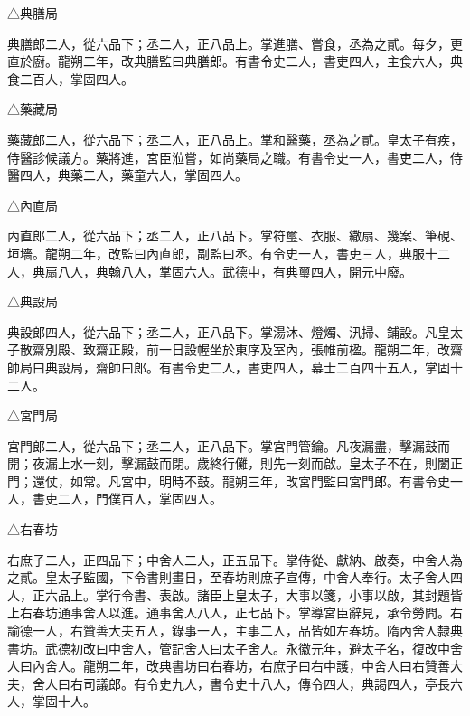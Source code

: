 \begin{pinyinscope}
 △典膳局



 典膳郎二人，從六品下；丞二人，正八品上。掌進膳、嘗食，丞為之貳。每夕，更直於廚。龍朔二年，改典膳監曰典膳郎。有書令史二人，書吏四人，主食六人，典食二百人，掌固四人。



 △藥藏局



 藥藏郎二人，從六品下；丞二人，正八品上。掌和醫藥，丞為之貳。皇太子有疾，侍醫診候議方。藥將進，宮臣涖嘗，如尚藥局之職。有書令史一人，書吏二人，侍醫四人，典藥二人，藥童六人，掌固四人。



 △內直局



 內直郎二人，從六品下；丞二人，正八品下。掌符璽、衣服、繖扇、幾案、筆硯、垣墻。龍朔二年，改監曰內直郎，副監曰丞。有令史一人，書吏三人，典服十二人，典扇八人，典翰八人，掌固六人。武德中，有典璽四人，開元中廢。



 △典設局



 典設郎四人，從六品下；丞二人，正八品下。掌湯沐、燈燭、汛掃、鋪設。凡皇太子散齋別殿、致齋正殿，前一日設幄坐於東序及室內，張帷前楹。龍朔二年，改齋帥局曰典設局，齋帥曰郎。有書令史二人，書吏四人，幕士二百四十五人，掌固十二人。



 △宮門局



 宮門郎二人，從六品下；丞二人，正八品下。掌宮門管鑰。凡夜漏盡，擊漏鼓而開；夜漏上水一刻，擊漏鼓而閉。歲終行儺，則先一刻而啟。皇太子不在，則闔正門；還仗，如常。凡宮中，明時不鼓。龍朔三年，改宮門監曰宮門郎。有書令史一人，書吏二人，門僕百人，掌固四人。



 △右春坊



 右庶子二人，正四品下；中舍人二人，正五品下。掌侍從、獻納、啟奏，中舍人為之貳。皇太子監國，下令書則畫日，至春坊則庶子宣傳，中舍人奉行。太子舍人四人，正六品上。掌行令書、表啟。諸臣上皇太子，大事以箋，小事以啟，其封題皆上右春坊通事舍人以進。通事舍人八人，正七品下。掌導宮臣辭見，承令勞問。右諭德一人，右贊善大夫五人，錄事一人，主事二人，品皆如左春坊。隋內舍人隸典書坊。武德初改曰中舍人，管記舍人曰太子舍人。永徽元年，避太子名，復改中舍人曰內舍人。龍朔二年，改典書坊曰右春坊，右庶子曰右中護，中舍人曰右贊善大夫，舍人曰右司議郎。有令史九人，書令史十八人，傳令四人，典謁四人，亭長六人，掌固十人。




\end{pinyinscope}
